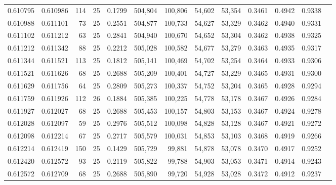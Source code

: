 \begin{tabular}{rrrrrrrrrrrrr}
0.610795 & 0.610986 &   114 &  25 &                                     0.1799 & 504,804 & 100,806 &  54,602 &  53,354 & 0.3461 & 0.4942 & 0.9338 \\
0.610988 & 0.611101 &    73 &  25 &                                     0.2551 & 504,877 & 100,733 &  54,627 &  53,329 & 0.3462 & 0.4940 & 0.9331 \\
0.611102 & 0.611212 &    63 &  25 &                                     0.2841 & 504,940 & 100,670 &  54,652 &  53,304 & 0.3462 & 0.4938 & 0.9325 \\
0.611212 & 0.611342 &    88 &  25 &                                     0.2212 & 505,028 & 100,582 &  54,677 &  53,279 & 0.3463 & 0.4935 & 0.9317 \\
0.611344 & 0.611521 &   113 &  25 &                                     0.1812 & 505,141 & 100,469 &  54,702 &  53,254 & 0.3464 & 0.4933 & 0.9306 \\
0.611521 & 0.611626 &    68 &  25 &                                     0.2688 & 505,209 & 100,401 &  54,727 &  53,229 & 0.3465 & 0.4931 & 0.9300 \\
0.611629 & 0.611756 &    64 &  25 &                                     0.2809 & 505,273 & 100,337 &  54,752 &  53,204 & 0.3465 & 0.4928 & 0.9294 \\
0.611759 & 0.611926 &   112 &  26 &                                     0.1884 & 505,385 & 100,225 &  54,778 &  53,178 & 0.3467 & 0.4926 & 0.9284 \\
0.611927 & 0.612027 &    68 &  25 &                                     0.2688 & 505,453 & 100,157 &  54,803 &  53,153 & 0.3467 & 0.4924 & 0.9278 \\
0.612028 & 0.612097 &    59 &  25 &                                     0.2976 & 505,512 & 100,098 &  54,828 &  53,128 & 0.3467 & 0.4921 & 0.9272 \\
0.612098 & 0.612214 &    67 &  25 &                                     0.2717 & 505,579 & 100,031 &  54,853 &  53,103 & 0.3468 & 0.4919 & 0.9266 \\
0.612214 & 0.612419 &   150 &  25 &                                     0.1429 & 505,729 &  99,881 &  54,878 &  53,078 & 0.3470 & 0.4917 & 0.9252 \\
0.612420 & 0.612572 &    93 &  25 &                                     0.2119 & 505,822 &  99,788 &  54,903 &  53,053 & 0.3471 & 0.4914 & 0.9243 \\
0.612572 & 0.612709 &    68 &  25 &                                     0.2688 & 505,890 &  99,720 &  54,928 &  53,028 & 0.3472 & 0.4912 & 0.9237 \\

\end{tabular}
